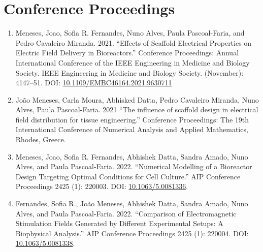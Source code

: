 \section{Conference Proceedings}
\begin{enumerate}
\item \small Meneses, Joao, Sofia R. Fernandes, Nuno Alves, Paula Pascoal-Faria, and Pedro Cavaleiro Miranda. 2021. “Effects of Scaffold Electrical Properties on Electric Field Delivery in Bioreactors.” Conference Proceedings: Annual International Conference of the IEEE Engineering in Medicine and Biology Society. IEEE Engineering in Medicine and Biology Society. (November): 4147–51. DOI: \href{https://doi.org/10.1109/EMBC46164.2021.9630711}{10.1109/EMBC46164.2021.9630711}
\item \small João Meneses, Carla Moura, Abhisked Datta, Pedro Cavaleiro Miranda, Nuno Alves, Paula Pascoal-Faria. 2021
“The influence of scaffold design in electrical field distribution for tissue engineering.'' Conference Proceedings: The 19th International Conference of Numerical Analysis and Applied Mathematics, Rhodes, Greece.
\item \small Meneses, Joao, Sofia R. Fernandes, Abhishek Datta, Sandra Amado, Nuno Alves, and Paula Pascoal-Faria. 2022. “Numerical Modelling of a Bioreactor Design Targeting Optimal Conditions for Cell Culture.” AIP Conference Proceedings 2425 (1): 220003. DOI: \href{https://doi.org/10.1063/5.0081336}{10.1063/5.0081336}.
\item \small Fernandes, Sofia R., João Meneses, Abhishek Datta, Sandra Amado, Nuno Alves, and Paula Pascoal-Faria. 2022. “Comparison of Electromagnetic Stimulation Fields Generated by Different Experimental Setups: A Biophysical Analysis.” AIP Conference Proceedings 2425 (1): 220004. DOI: \href{https://doi.org/10.1063/5.0081338}{10.1063/5.0081338}.
\end{enumerate}


